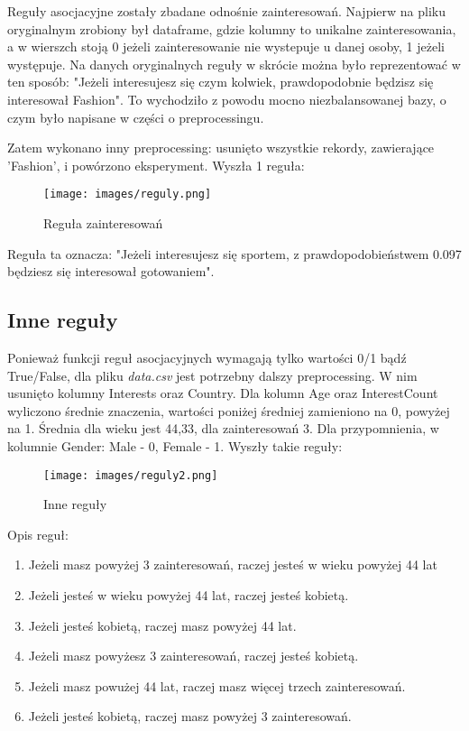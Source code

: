 \documentclass[12pt,a4paper]{article}
\begin{document}
Reguły asocjacyjne zostały zbadane odnośnie zainteresowań. Najpierw na pliku oryginalnym zrobiony był dataframe, gdzie kolumny to unikalne zainteresowania, a w wierszch stoją 0 jeżeli zainteresowanie nie wystepuje u danej osoby, 1 jeżeli występuje. Na danych oryginalnych reguły w skrócie można było reprezentować w ten sposób: "Jeżeli interesujesz się czym kolwiek, prawdopodobnie będzisz się interesował Fashion". To wychodziło z powodu mocno niezbalansowanej bazy, o czym było napisane w części o preprocessingu.

Zatem wykonano inny preprocessing: usunięto wszystkie rekordy, zawierające 'Fashion', i powórzono eksperyment. Wyszła 1 reguła: 

\begin{figure}[h]
    \centering
    \texttt{[image: images/reguly.png]}
    \caption{Reguła zainteresowań}
    \label{fig:reg1}
\end{figure}

Reguła ta oznacza: "Jeżeli interesujesz się sportem, z prawdopodobieństwem 0.097 będziesz się interesował gotowaniem".

\subsection{Inne reguły}

Ponieważ funkcji reguł asocjacyjnych wymagają tylko wartości 0/1 bądź True/False, dla pliku \textit{data.csv} jest potrzebny dalszy preprocessing. W nim usunięto kolumny Interests oraz Country. Dla kolumn Age oraz InterestCount wyliczono średnie znaczenia, wartości poniżej średniej zamieniono na 0, powyżej na 1. Średnia dla wieku jest 44,33, dla zainteresowań 3. Dla przypomnienia, w kolumnie Gender: Male - 0, Female - 1. Wyszły takie reguły:

\begin{figure}[h]
    \centering
    \texttt{[image: images/reguly2.png]}
    \caption{Inne reguły}
    \label{fig:reg1}
\end{figure}

Opis reguł:

\begin{enumerate}
    \item Jeżeli masz powyżej 3 zainteresowań, raczej jesteś w wieku powyżej 44 lat
    \item Jeżeli jesteś w wieku powyżej 44 lat, raczej jesteś kobietą.
    \item Jeżeli jesteś kobietą, raczej masz powyżej 44 lat.
    \item Jeżeli masz powyżesz 3 zainteresowań, raczej jesteś kobietą.
    \item Jeżeli masz powużej 44 lat, raczej masz więcej trzech zainteresowań.
    \item Jeżeli jesteś kobietą, raczej masz powyżej 3 zainteresowań.
\end{enumerate}
\end{document}
